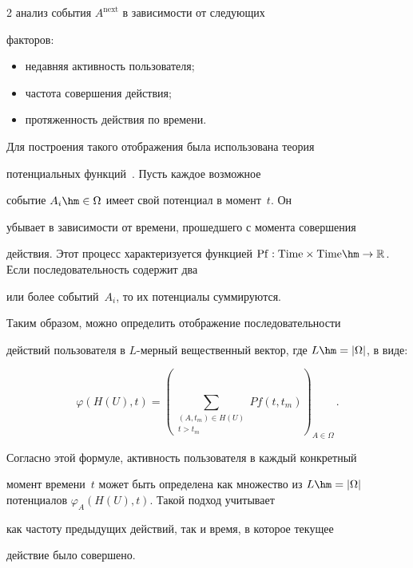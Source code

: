 \begin{multicols}{2}
анализ события $A^{\mathrm{next}}$ в зависимости от  сле\-ду\-ющих

факторов:

\begin{itemize}

  \item недавняя активность пользователя;

  \item частота совершения действия;

  \item протяженность действия по времени.

\end{itemize}



Для построения такого отображения была использована теория

потенциальных функций~\cite{aizerman}. Пусть каждое возможное

событие $A_i \hm\in \Omega$ имеет свой потенциал в момент~$t$. Он

убывает в за\-ви\-си\-мости от времени, прошедшего с момента совершения

действия. Этот процесс характеризуется функцией $\mathrm{Pf}: \mathrm{Time} \times

\mathrm{Time} \hm\rightarrow \mathbb R$. Если последовательность содержит два

или более событий~$A_i$, то их потенциалы суммируются.



Таким образом, можно определить отображение последовательности

действий пользователя в $L$-мер\-ный вещественный вектор, где $L \hm=

|\Omega|$,  в виде:

$$

  \varphi(H(U), t) = \left(

  \sum\limits_{\substack{(A, t_m) \in H(U) \\ t > t_m}} P\!f(t, t_m) \right)_{A \in \Omega}\,.

$$

Согласно этой формуле, активность пользователя в каждый конкретный

момент времени~$t$ может быть определена как множество из $L \hm=

|\Omega|$ потенциалов $\varphi_A(H(U), t)$. Такой подход учитывает

как частоту предыдущих действий, так и время, в которое текущее

действие было совершено.




\end{multicols}

